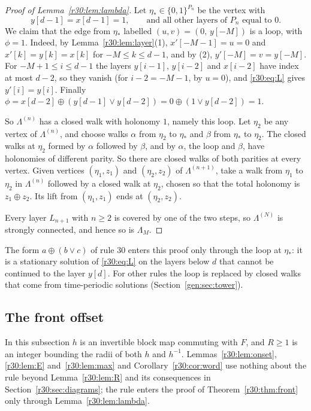 \begin{proof}[Proof of Lemma~\ref{r30:lem:lambda}]
Let $\eta_*\in\{0,1\}^{P_n}$ be the vertex with
\begin{equation}\label{r30:eq:loop}
y[d-1]=x[d-1]=1,\qquad\text{and all other layers of $P_n$ equal to $0$.}
\end{equation}
We claim that the edge from $\eta_*$ labelled $(u,v)=(0,\,y[-M])$ is a loop, with $\phi=1$. Indeed, by Lemma~\ref{r30:lem:layer}(1), $x'[-M-1]=u=0$ and $x'[k]=y[k]=x[k]$ for $-M\le k\le d-1$, and by (2), $y'[-M]=v=y[-M]$. For $-M+1\le i\le d-1$ the layers $y[i-1]$, $y[i-2]$ and $x[i-2]$ have index at most $d-2$, so they vanish (for $i-2=-M-1$, by $u=0$), and \eqref{r30:eq:L} gives $y'[i]=y[i]$. Finally $\phi=x[d-2]\oplus(y[d-1]\vee y[d-2])=0\oplus(1\vee y[d-2])=1$.

So $\Lambda^{(n)}$ has a closed walk with holonomy $1$, namely this loop. Let $\eta_2$ be any vertex of $\Lambda^{(n)}$, and choose walks $\alpha$ from $\eta_2$ to $\eta_*$ and $\beta$ from $\eta_*$ to $\eta_2$. The closed walks at $\eta_2$ formed by $\alpha$ followed by $\beta$, and by $\alpha$, the loop and $\beta$, have holonomies of different parity. So there are closed walks of both parities at every vertex. Given vertices $(\eta_1,z_1)$ and $(\eta_2,z_2)$ of $\Lambda^{(n+1)}$, take a walk from $\eta_1$ to $\eta_2$ in $\Lambda^{(n)}$ followed by a closed walk at $\eta_2$, chosen so that the total holonomy is $z_1\oplus z_2$. Its lift from $(\eta_1,z_1)$ ends at $(\eta_2,z_2)$.

Every layer $L_{n+1}$ with $n\ge2$ is covered by one of the two steps, so $\Lambda^{(N)}$ is strongly connected, and hence so is $\Lambda_M$.
\end{proof}

The form $a\oplus(b\vee c)$ of rule $30$ enters this proof only through the loop at $\eta_*$: it is a stationary solution of \eqref{r30:eq:L} on the layers below $d$ that cannot be continued to the layer $y[d]$. For other rules the loop is replaced by closed walks that come from time-periodic solutions (Section~\ref{gen:sec:tower}).

\subsection{The front offset}\label{r30:sec:front}

In this subsection $h$ is an invertible block map commuting with $F$, and $R\ge1$ is an integer bounding the radii of both $h$ and $h^{-1}$. Lemmas~\ref{r30:lem:onset}, \ref{r30:lem:E} and~\ref{r30:lem:max} and Corollary~\ref{r30:cor:word} use nothing about the rule beyond Lemma~\ref{r30:lem:R} and its consequences in Section~\ref{r30:sec:diagrams}; the rule enters the proof of Theorem~\ref{r30:thm:front} only through Lemma~\ref{r30:lem:lambda}.

